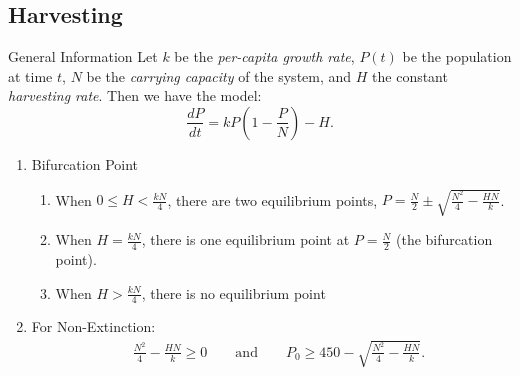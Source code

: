 \documentclass[oneside]{book}
\begin{document}
\subsection{Harvesting}
\begin{stbox}{General Information}
  Let \(k\) be the \emph{per-capita growth rate}, \(P(t)\) be the population at time \(t\), \(N\) be the \emph{carrying capacity} of the system, and \(H\) the constant \emph{harvesting rate}. Then we have the model:
  \[\frac{dP}{dt}=kP\left(1-\frac{P}{N}\right)-H.\]
\begin{enumerate}
  \item Bifurcation Point
  \begin{enumerate}
    \item When \(0 \leq H<\frac{kN}{4}\), there are two equilibrium points, \(P=\frac{N}{2}\pm \sqrt{\frac{N^2}{4}-\frac{HN}{k}}\).
    \item When \(H=\frac{kN}{4}\), there is one equilibrium point at \(P=\frac{N}{2}\) (the bifurcation point).
    \item When \(H>\frac{kN}{4}\), there is no equilibrium point
  \end{enumerate}
  \item For Non-Extinction: 
  \begin{align*}
    \quad\frac{N^2}{4}-\frac{HN}{k} \geq 0 \qquad\text{and}\qquad P_0 \geq 450-\sqrt{\frac{N^2}{4}-\frac{HN}{k}}.
  \end{align*}
\end{enumerate}
\end{stbox}
\end{document}
